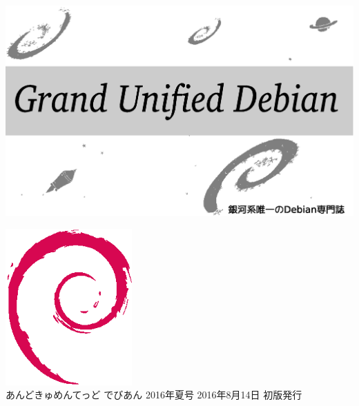 \documentclass[mingoth,a4paper]{jsarticle}
\begin{document}
\begin{titlepage}
\thispagestyle{empty}

\hspace*{-2.5cm}
\includegraphics{image2012-natsu/gudeb.eps}\\
\vspace*{0.1cm}

\vspace*{2cm}

\vspace*{-1.5cm}
\hspace*{11cm}\includegraphics[height=6cm]{image200502/openlogo-nd.eps}\\
\vspace*{0.1cm}
\hfill あんどきゅめんてっど でびあん 2016年夏号 2016年8月14日 初版発行
\end{titlepage}

\newpage
\thispagestyle{empty}\mbox{}
\newpage
\end{document}
